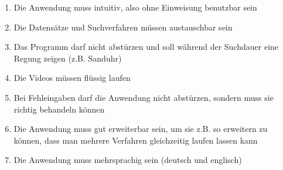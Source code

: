 \begin{enumerate}[label=\bfseries /NF \arabic*0/]
  \item Die Anwendung muss intuitiv, also ohne Einweisung benutzbar sein
  \item Die Datensätze und Suchverfahren müssen austauschbar sein
  \item Das Programm darf nicht abstürzen und soll während der Suchdauer eine Regung zeigen (z.B. Sanduhr)
  \item Die Videos müssen flüssig laufen
  \item Bei Fehleingaben darf die Anwendung nicht abstürzen, sondern muss sie richtig behandeln können
  \item Die Anwendung muss gut erweiterbar sein, um sie z.B. so erweitern zu können, dass man mehrere Verfahren gleichzeitig laufen lassen kann
  \item Die Anwendung muss mehrsprachig sein (deutsch und englisch)
\end{enumerate}
